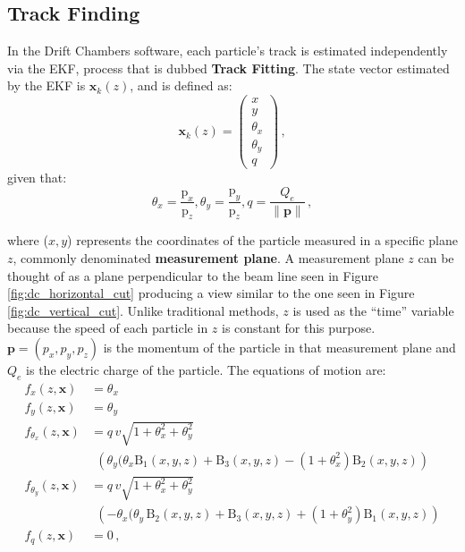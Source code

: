 \subsection{Track Finding} \label{ssec:framework_tf}
In the Drift Chambers software, each particle's track is estimated independently via the EKF, process that is dubbed \textbf{Track Fitting}.
The state vector estimated by the EKF is $\mathbf{x}_k(z)$, and is defined as:
    \begin{equation*}
        \mathbf{x}_k(z) = \begin{pmatrix}x\\ y\\ \theta_x\\ \theta_y\\ q\end{pmatrix}\,,
    \end{equation*}
given that:
    \begin{equation*}
        \theta_x = \frac{\text{p}_x}{\text{p}_z},
        \theta_y = \frac{\text{p}_y}{\text{p}_z},
        q = \frac{Q_e}{\|\mathbf{p}\|}\,,
    \end{equation*}
    
where ($x,y$) represents the coordinates of the particle measured in a specific plane $z$, commonly denominated \textbf{measurement plane}.
A measurement plane $z$ can be thought of as a plane perpendicular to the beam line seen in Figure \ref{fig:dc_horizontal_cut} producing a view similar to the one seen in Figure \ref{fig:dc_vertical_cut}.
Unlike traditional methods, $z$ is used as the ``time'' variable because the speed of each particle in $z$ is constant for this purpose.
$\mathbf{p}=(p_x,p_y,p_z)$ is the momentum of the particle in that measurement plane and $Q_e$ is the electric charge of the particle. The equations of motion
are:
    \begin{align*}
        f_x(z, \mathbf{x}) &= \theta_x\\
        f_y(z, \mathbf{x}) &= \theta_y\\
        \nonumber f_{\theta_x}(z, \mathbf{x}) &= q\, v \sqrt{1+\theta_x^2+\theta_y^2}\\
        &~~\left(\theta_y(\theta_x \operatorname{B_{1}}(x,y,z)+\operatorname{B_{3}}(x,y,z) - (1+\theta_x^2) \operatorname{B_{2}}(x,y,z)\right)\\
        \nonumber f_{\theta_y}(z, \mathbf{x}) &= q\, v \sqrt{1+\theta_x^2+\theta_y^2}\\ 
        &~~\left(-\theta_x (\theta_y\, \operatorname{B_{2}}(x,y,z)+\operatorname{B_{3}}(x,y,z) + (1+\theta_y^2) \operatorname{B_{1}}(x,y,z)\right)\\
        f_q(z, \mathbf{x}) &= 0\,,
    \end{align*}

